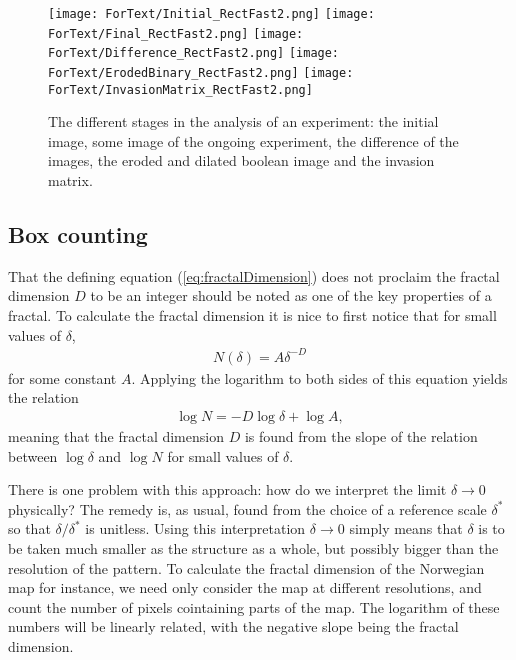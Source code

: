 \documentclass[twoside,utf8]{article}
\newcommand{\EQU}[1] { \begin{equation*} \begin{split} #1 \end{split} \end{equation*} }
\newcommand{\EQUn}[1] { \begin{equation} \begin{split} #1 \end{split} \end{equation} }
\begin{document}
\begin{figure}[H]
	\begin{center}
	\texttt{[image: ForText/Initial\_RectFast2.png]}
	\texttt{[image: ForText/Final\_RectFast2.png]}
	\texttt{[image: ForText/Difference\_RectFast2.png]}
	\texttt{[image: ForText/ErodedBinary\_RectFast2.png]}
	\texttt{[image: ForText/InvasionMatrix\_RectFast2.png]}
	\end{center}
	\caption{ The different stages in the analysis of an experiment: the initial image, some image of the ongoing experiment, the difference of the images, the eroded and dilated boolean image and the invasion matrix. }
	\label{fig:binarized}
\end{figure}




\subsection{Box counting}
That the defining equation (\ref{eq:fractalDimension}) does not proclaim the fractal dimension $D$ to be an integer should be noted as one of the key properties of a fractal. To calculate the fractal dimension it is nice to first notice that for small values of $\delta$,
\EQUn{
N(\delta) = A\delta^{-D} \label{eq:FractalDimIdea}
}
for some constant $A$. Applying the logarithm to both sides of this equation yields the relation
\EQU{
\log N = -D \log \delta + \log A,
}
meaning that the fractal dimension $D$ is found from the slope of the relation between $\log \delta$ and $\log N$ for small values of $\delta$.

There is one problem with this approach: how do we interpret the limit $\delta \rightarrow 0$ physically? The remedy is, as usual, found from the choice of a reference scale $\delta^*$ so that $\delta/\delta^*$ is unitless. Using this interpretation $\delta \rightarrow 0$ simply means that $\delta$ is to be taken much smaller as the structure as a whole, but possibly bigger than the resolution of the pattern. To calculate the fractal dimension of the Norwegian map for instance, we need only consider the map at different resolutions, and count the number of pixels cointaining parts of the map. The logarithm of these numbers will be linearly related, with the negative slope being the fractal dimension.

\begin{comment}

	\end{comment}
\end{document}
